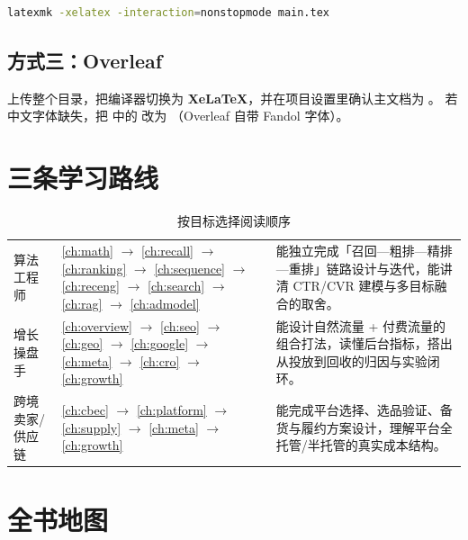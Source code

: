 \begin{lstlisting}[style=growthnoline, language=bash]
latexmk -xelatex -interaction=nonstopmode main.tex
\end{lstlisting}

\subsection*{方式三：Overleaf}

上传整个目录，把编译器切换为 \textbf{XeLaTeX}，并在项目设置里确认主文档为 。
若中文字体缺失，把  中的  改为 
（Overleaf 自带 Fandol 字体）。

\section*{三条学习路线}

\begin{table}[htbp]
\centering
\caption{按目标选择阅读顺序}
\label{tab:routes}
\small
\begin{tabularx}{\textwidth}{L{2.6cm} L{5.2cm} Y}
\toprule
{} &  &  \\
\midrule
算法工程师 &
\cref{ch:math} $\to$ \cref{ch:recall} $\to$ \cref{ch:ranking} $\to$ \cref{ch:sequence} $\to$ \cref{ch:receng}
$\to$ \cref{ch:search} $\to$ \cref{ch:rag} $\to$ \cref{ch:admodel} &
能独立完成「召回—粗排—精排—重排」链路设计与迭代，能讲清 CTR/CVR 建模与多目标融合的取舍。 \\
\addlinespace
增长操盘手 &
\cref{ch:overview} $\to$ \cref{ch:seo} $\to$ \cref{ch:geo} $\to$ \cref{ch:google} $\to$ \cref{ch:meta}
$\to$ \cref{ch:cro} $\to$ \cref{ch:growth} &
能设计自然流量 + 付费流量的组合打法，读懂后台指标，搭出从投放到回收的归因与实验闭环。 \\
\addlinespace
跨境卖家/供应链 &
\cref{ch:cbec} $\to$ \cref{ch:platform} $\to$ \cref{ch:supply} $\to$ \cref{ch:meta}
$\to$ \cref{ch:growth} &
能完成平台选择、选品验证、备货与履约方案设计，理解平台全托管/半托管的真实成本结构。 \\
\bottomrule
\end{tabularx}
\end{table}

\section*{全书地图}

